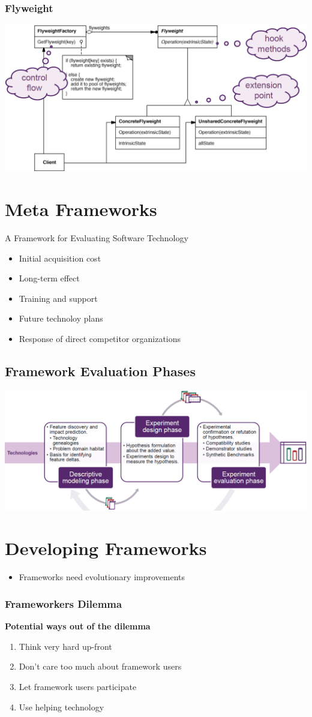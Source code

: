\subsubsection{Flyweight}
\includegraphics[width=\linewidth]{./img/flyweight_hooks.png}



\section{Meta Frameworks}
A Framework for Evaluating Software Technology
\begin{itemize}
    \item Initial acquisition cost
    \item Long-term effect
    \item Training and support
    \item Future technoloy plans
    \item Response of direct competitor organizations
\end{itemize}

\subsection{Framework Evaluation Phases}
\includegraphics[width=\linewidth]{./img/framework_eval.png}

\section{Developing Frameworks}
\begin{itemize}
    \item Frameworks need evolutionary improvements
\end{itemize}
\subsubsection{Frameworkers Dilemma}
\textbf{Potential ways out of the dilemma}
\begin{enumerate}
    \item Think very hard up-front
    \item Don't care too much about framework users
    \item Let framework users participate
    \item Use helping technology
\end{enumerate}